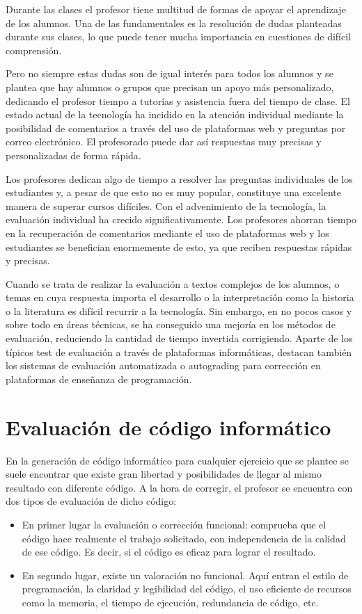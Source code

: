 Durante las clases el profesor tiene multitud de formas de apoyar el aprendizaje de los alumnos. Una de las fundamentales es la resolución de dudas planteadas durante sus clases, lo que puede tener mucha importancia en cuestiones de difícil comprensión. 

Pero no siempre estas dudas son de igual interés para todos los alumnos y se plantea que hay alumnos o grupos que precisan un apoyo más personalizado, dedicando el profesor tiempo a tutorías y asistencia fuera del tiempo de clase. El estado actual de la tecnología ha incidido en la atención individual mediante la posibilidad de comentarios a través del uso de plataformas web y preguntas por correo electrónico. El profesorado puede dar así respuestas muy precisas y personalizadas de forma rápida.

Los profesores dedican algo de tiempo a resolver las preguntas individuales de los estudiantes y, a pesar de que esto no es muy popular, constituye una excelente manera de superar cursos difíciles. Con el advenimiento de la tecnología, la evaluación individual ha crecido significativamente. Los profesores ahorran tiempo en la recuperación de comentarios mediante el uso de plataformas web y los estudiantes se benefician enormemente de esto, ya que reciben respuestas rápidas y precisas. 

Cuando se trata de realizar la evaluación a  textos complejos de los alumnos, o temas en cuya respuesta importa el desarrollo o la interpretación como la historia o la literatura es difícil recurrir a la tecnología. Sin embargo, en no pocos casos y sobre todo en áreas técnicas, se ha conseguido una mejoría en los métodos de evaluación, reduciendo la cantidad de tiempo invertida corrigiendo. Aparte de los típicos test de evaluación a través de plataformas informáticas, destacan también los sistemas de evaluación automatizada o autograding para corrección en plataformas de enseñanza de programación.


\section{Evaluación de código informático}
En la generación de código informático para cualquier ejercicio que se plantee se suele encontrar que existe gran libertad y posibilidades de llegar al mismo resultado con diferente código. A la hora de corregir, el profesor se encuentra con dos tipos de evaluación de dicho código:

\begin{itemize}
\item En primer lugar la evaluación o corrección funcional: comprueba que el código hace realmente el trabajo solicitado, con independencia de la calidad de ese código. Es decir, si el código es eficaz para lograr el resultado.
\item En segundo lugar, existe un valoración no funcional. Aquí entran el estilo de programación, la claridad y legibilidad del código, el uso eficiente de recursos como la memoria, el tiempo de ejecución, redundancia de código, etc.
\end{itemize}


